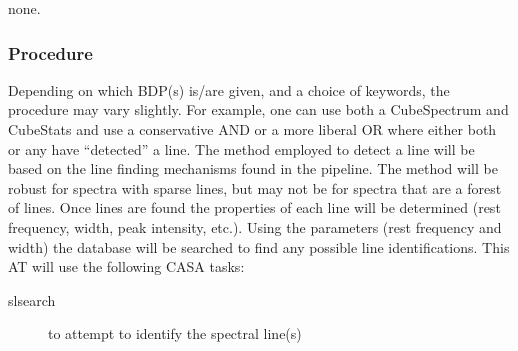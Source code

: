 none.

\subsubsection{Procedure}
Depending on which BDP(s) is/are given, and a choice of keywords, the procedure may vary slightly.  For example, one can use both a CubeSpectrum and CubeStats and use a conservative AND or a more
liberal OR where either both or any have ``detected'' a line. The method employed to detect a line will be based on the line finding mechanisms found in the pipeline. The method will be robust for spectra with sparse lines, but may not be for spectra that are a forest of lines. Once lines are found the properties of each line will be determined (rest frequency, width, peak intensity, etc.). Using the parameters (rest frequency and width) the database will be searched to find any possible line identifications.
This AT will use the following CASA tasks:
\begin{description}
\item[slsearch] to attempt to identify the spectral line(s)
\end{description}


\clearpage

